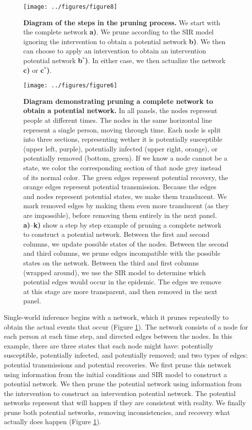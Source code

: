 \documentclass[PTRSB]{rsos}
\makeatletter
\def\checkGraphicsWidth{\ifdim\Gin@nat@width>\linewidth
	\tsGraphicsScaleX\linewidth\else\Gin@nat@width\fi}
\let\ts@includegraphics\includegraphics
\renewcommand{\includegraphics}[1]{\ts@includegraphics[width=\checkGraphicsWidth]{#1}}
\makeatother
\begin{document}
\begin{multicols}{2}
\begin{figure}[hp]
\texttt{[image: ../figures/figure8]}
\caption{\textbf{Diagram of the steps in the pruning process.}  We start with the complete network \textbf{a)}.  We prune according to the SIR model ignoring the intervention to obtain a potential network \textbf{b)}.  We then can choose to apply an intervention to obtain an intervention potential network \textbf{b${}^*$)}.  In either case, we then actualize the network \textbf{c)} or \textbf{c${}^*$)}.}
\label{fig:outline}
\end{figure}

\begin{figure}[hp]
\texttt{[image: ../figures/figure6]}
\caption{\textbf{Diagram demonstrating pruning a complete network to obtain a potential network.}  In all panels, the nodes represent people at different times.  The nodes in the same horizontal line represent a single person, moving through time.  Each node is split into three sections, representing wether it is potentially susceptible (upper left, purple), potentially infected (upper right, orange), or potentially removed (bottom, green).  If we know a node cannot be a state, we color the corresponding section of that node grey instead of its normal color.  The green edges represent potential recovery, the orange edges represent potential transmission.  Because the edges and nodes represent potential states, we make them translucent.  We mark removed edges by making them even more translucent (as they are impossible), before removing them entirely in the next panel.  \textbf{a)}--\textbf{k)} show a step by step example of pruning a complete network to construct a potential network.  Between the first and second columns, we update possible states of the nodes.  Between the second and third columns, we prune edges incompatible with the possible states on the network.  Between the third and first columns (wrapped around), we use the SIR model to determine which potential edges would occur in the epidemic.  The edges we remove at this stage are more transparent, and then removed in the next panel.}
\label{fig:pruning}
\end{figure}

Single-world inference begins with a network, which it prunes repeatedly to obtain the actual events that occur (Figure \ref{fig:outline}).
The network consists of a node for each person at each time step, and directed edges between the nodes.
In this example, there are three states that each node might have: potentially susceptible, potentially infected, and potentially removed; and two types of edges: potential transmissions and potential recoveries.
We first prune this network using information from the initial conditions and SIR model to construct a potential network.
We then prune the potential network using information from the intervention to construct an intervention potential network.
The potential networks represent that will happen if they are consistent with reality.
We finally prune both potential networks, removing inconsistencies, and recovery what actually does happen (Figure \ref{fig:outline}).


\end{multicols}
\end{document}
